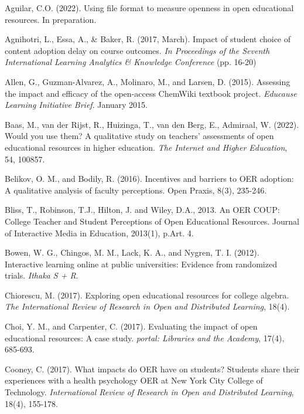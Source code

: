 \documentclass[11pt]{article}
\newcommand{\alink}[2]{\href{#1}{\textcolor{blue}{#2}}}
\begin{document}
\begin{thebibliography}{99}

   Aguilar, C.O. (2022). Using file format to measure openness in open educational resources. In preparation.

   Agnihotri, L., Essa, A., \& Baker, R. (2017, March). Impact of student choice of content adoption delay on course outcomes. {\em In Proceedings of the Seventh International Learning Analytics \& Knowledge Conference} (pp. 16-20)

   Allen, G., Guzman-Alvarez, A., Molinaro, M., and Larsen, D. (2015). Assessing the impact and efficacy of the open-access ChemWiki textbook project. {\em Educause Learning Initiative Brief}. January 2015.

   Baas, M., van der Rijst, R., Huizinga, T., van den Berg, E., Admiraal, W. (2022). Would you use them? A qualitative study on teachers' assessments of open educational resources in higher education. {\em The Internet and Higher Education}, 54, 100857.

   Belikov, O. M., and Bodily, R. (2016). Incentives and barriers to OER adoption: A qualitative analysis of faculty perceptions. Open Praxis, 8(3), 235-246. %
  
   Bliss, T., Robinson, T.J., Hilton, J. and Wiley, D.A., 2013. An OER COUP: College Teacher and Student Perceptions of Open Educational Resources. Journal of Interactive Media in Education, 2013(1), p.Art. 4.%

   Bowen, W. G., Chingos, M. M., Lack, K. A., and Nygren, T. I. (2012). Interactive learning online at public universities: Evidence from randomized trials. {\em Ithaka S + R}.

   Chiorescu, M. (2017). Exploring open educational resources for college algebra. {\em The International Review of Research in Open and Distributed Learning}, 18(4).

   Choi, Y. M., and Carpenter, C. (2017). Evaluating the impact of open educational resources: A case study. {\em portal: Libraries and the Academy}, 17(4), 685-693.

   Cooney, C. (2017). What impacts do OER have on students? Students share their experiences with a health psychology OER at New York City College of Technology. {\em International Review of Research in Open and Distributed Learning}, 18(4), 155-178.


\end{thebibliography}
\end{document}
